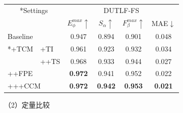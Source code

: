 \begin{table}
	\centering
	\label{chpt4:tab:abl_3}
		\begin{tabular}{llcccc}
			\toprule  %
			
			\multicolumn{2}{c}{ \multirow{2}*{Settings}}	& \multicolumn{4}{c}{DUTLF-FS} \\ %
			
			\cmidrule(r){3-6} 
			
			& & $E_{\phi}^{max}\uparrow$ & $S_{\alpha }\uparrow $ & $F_{\beta}^{max}\uparrow$ & MAE$\downarrow$ \\
			\midrule
			
			\multicolumn{2}{l}{ Baseline }     & 0.947 & 0.894 & 0.901 & 0.048 \\ 
			
			
			\midrule
			
			\multicolumn{1}{c}{ \multirow{2}*{+TCM}}	
			
			& +TI		& 0.961 & 0.923 & 0.932 & 0.034 \\ 
			& ++TS & 0.968 & 0.933 & 0.944 & 0.027 \\
			\midrule
			
			\multicolumn{2}{l}{++FPE} 		& \textbf{0.972} & 0.941 & 0.952 & 0.022 \\
			\multicolumn{2}{l}{+++CCM} 		& \textbf{0.972} & \textbf{0.942} & \textbf{0.953} & \textbf{0.021} \\ 
			
			
			\bottomrule
		\end{tabular}
\end{table}





（2）定量比较

